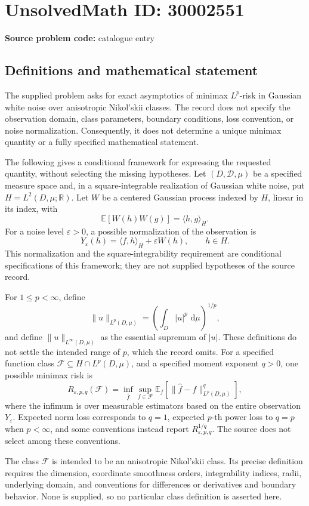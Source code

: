 \documentclass[11pt]{article}
\newcommand{\R}{\mathbb{R}}
\newcommand{\E}{\mathbb{E}}
\newcommand{\dd}{\,\mathrm{d}}
\begin{document}
\section*{UnsolvedMath ID: 30002551}
\textbf{Source problem code:} catalogue entry
\subsection{Definitions and mathematical statement}
The supplied problem asks for exact asymptotics of minimax \(L^p\)-risk in Gaussian white noise over anisotropic Nikol'skii classes. The record does not specify the observation domain, class parameters, boundary conditions, loss convention, or noise normalization. Consequently, it does not determine a unique minimax quantity or a fully specified mathematical statement.

The following gives a conditional framework for expressing the requested quantity, without selecting the missing hypotheses. Let \((D,\mathcal D,\mu)\) be a specified measure space and, in a square-integrable realization of Gaussian white noise, put \(H=L^2(D,\mu;\R)\). Let \(W\) be a centered Gaussian process indexed by \(H\), linear in its index, with
\[
\E[W(h)W(g)]=\langle h,g\rangle_H.
\]
For a noise level \(\varepsilon>0\), a possible normalization of the observation is
\[
Y_\varepsilon(h)=\langle f,h\rangle_H+\varepsilon W(h),\qquad h\in H.
\]
This normalization and the square-integrability requirement are conditional specifications of this framework; they are not supplied hypotheses of the source record.

For \(1\le p<\infty\), define
\[
\|u\|_{L^p(D,\mu)}=\left(\int_D |u|^p\,\dd\mu\right)^{1/p},
\]
and define \(\|u\|_{L^\infty(D,\mu)}\) as the essential supremum of \(|u|\). These definitions do not settle the intended range of \(p\), which the record omits. For a specified function class \(\mathcal F\subseteq H\cap L^p(D,\mu)\), and a specified moment exponent \(q>0\), one possible minimax risk is
\[
R_{\varepsilon,p,q}(\mathcal F)
=\inf_{\widehat f}\sup_{f\in\mathcal F}
\E_f\!\left[\|\widehat f-f\|_{L^p(D,\mu)}^q\right],
\]
where the infimum is over measurable estimators based on the entire observation \(Y_\varepsilon\). Expected norm loss corresponds to \(q=1\), expected \(p\)-th power loss to \(q=p\) when \(p<\infty\), and some conventions instead report \(R_{\varepsilon,p,q}^{1/q}\). The source does not select among these conventions.

The class \(\mathcal F\) is intended to be an anisotropic Nikol'skii class. Its precise definition requires the dimension, coordinate smoothness orders, integrability indices, radii, underlying domain, and conventions for differences or derivatives and boundary behavior. None is supplied, so no particular class definition is asserted here.
\end{document}
